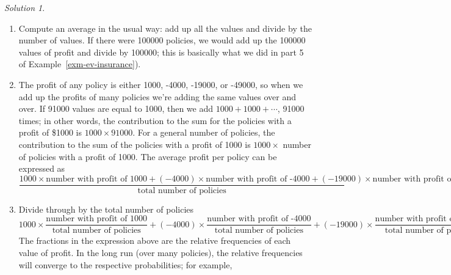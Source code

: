 \documentclass[
  letterpaper,
  DIV=11,
  numbers=noendperiod]{scrreprt}
\providecommand{\tightlist}{%
  \setlength{\itemsep}{0pt}\setlength{\parskip}{0pt}}
\theoremstyle{plain}
\theoremstyle{definition}
\theoremstyle{definition}
\theoremstyle{definition}
\theoremstyle{remark}
\newtheorem{refsolution}{Solution}[chapter]
\begin{document}
\begin{tcolorbox}[enhanced jigsaw, opacityback=0, rightrule=.15mm, coltitle=black, colframe=quarto-callout-tip-color-frame, toprule=.15mm, colbacktitle=quarto-callout-tip-color!10!white, opacitybacktitle=0.6, left=2mm, toptitle=1mm, breakable, title={Solution (click to expand)}, bottomtitle=1mm, colback=white, leftrule=.75mm, titlerule=0mm, arc=.35mm, bottomrule=.15mm]

\begin{refsolution}
\leavevmode

\begin{enumerate}
\def\labelenumi{\arabic{enumi}.}
\tightlist
\item
  Compute an average in the usual way: add up all the values and divide
  by the number of values. If there were 100000 policies, we would add
  up the 100000 values of profit and divide by 100000; this is basically
  what we did in part 5 of Example~\ref{exm-ev-insurance}).
\item
  The profit of any policy is either 1000, -4000, -19000, or -49000, so
  when we add up the profits of many policies we're adding the same
  values over and over. If 91000 values are equal to 1000, then we add
  \(1000 + 1000 + \cdots\), 91000 times; in other words, the
  contribution to the sum for the policies with a profit of \$1000 is
  \(1000\times 91000\). For a general number of policies, the
  contribution to the sum of the policies with a profit of 1000 is
  \(1000\times\) number of policies with a profit of 1000. The average
  profit per policy can be expressed as \[
  {\scriptscriptstyle
  \frac{1000\times \text{number with profit of 1000} + (-4000)\times \text{number with profit of -4000}  + (-19000) \times \text{number with profit of -19000}  + (-49000) \times \text{number with profit of -49000} }{\text{total number of policies}}
  }
  \]
\item
  Divide through by the total number of policies \[
  {\scriptstyle
  1000\times \frac{\text{number with profit of 1000}}{\text{total number of policies}} + (-4000)\times \frac{\text{number with profit of -4000}}{\text{total number of policies}}  + (-19000) \times \frac{\text{number with profit of -19000}}{\text{total number of policies}}  + (-49000) \times \frac{\text{number with profit of -49000}}{\text{total number of policies}}
  }
  \] The fractions in the expression above are the relative frequencies
  of each value of profit. In the long run (over many policies), the
  relative frequencies will converge to the respective probabilities;
  for example,

\end{enumerate}
\end{refsolution}
\end{tcolorbox}
\end{document}
